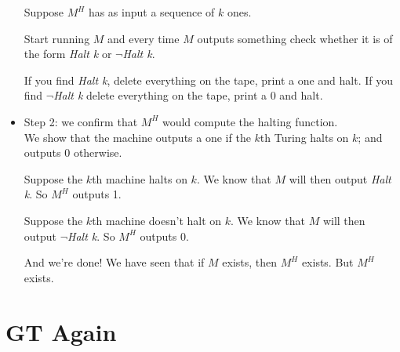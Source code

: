 \documentclass[justified]{tufte-handout}
\begin{document}
\begin{itemize}
\vspace{.2cm}

\noindent Suppose $M^H$ has as input a sequence of $k$ ones.

\vspace{.4cm}

\noindent Start running $M$ and every time $M$ outputs something check whether it is of the form \emph{Halt k} or $\neg$\emph{Halt k}. 

\vspace{.4cm}

\noindent If you find \emph{Halt k}, delete everything on the tape, print a one and halt. If you find $\neg$\emph{Halt k} delete everything on the tape, print a 0 and halt. 

\vspace{.7cm}


\item Step 2: we confirm that $M^H$ would compute the halting function.\\ We show that the machine outputs a one if the $k$th Turing halts on $k$; and outputs 0 otherwise.

\vspace{.4cm}

\noindent Suppose the $k$th machine halts on $k$. We know that $M$ will then output \emph{Halt k}. So $M^H$ outputs 1.


\vspace{.4cm}

\noindent Suppose the $k$th machine doesn't halt on $k$. We know that $M$ will then output $\neg$\emph{Halt k}. So $M^H$ outputs 0.

\vspace{.4cm}

 \noindent And we're done! We have seen that if $M$ exists, then $M^H$ exists. But $M^H$ exists.

\end{itemize}

\section{GT Again}
\end{document}
